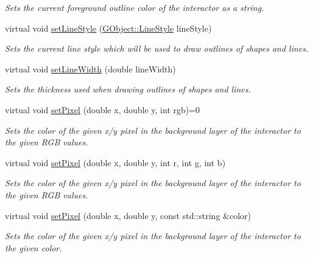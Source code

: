 \begin{DoxyCompactItemize}
\begin{DoxyCompactList}\small\item\em Sets the current foreground outline color of the interactor as a string. \end{DoxyCompactList}\item 
virtual void \mbox{\hyperlink{classsgl_1_1GDrawingSurface_a6bfe14a77101db0fb97b5a7e07a5526b}{set\+Line\+Style}} (\mbox{\hyperlink{classsgl_1_1GObject_a86e0f5648542856159bb40775c854aa7}{G\+Object\+::\+Line\+Style}} line\+Style)
\begin{DoxyCompactList}\small\item\em Sets the current line style which will be used to draw outlines of shapes and lines. \end{DoxyCompactList}\item 
virtual void \mbox{\hyperlink{classsgl_1_1GDrawingSurface_afd6a47c6ea6a1f85ca05a65ba3ff3477}{set\+Line\+Width}} (double line\+Width)
\begin{DoxyCompactList}\small\item\em Sets the thickness used when drawing outlines of shapes and lines. \end{DoxyCompactList}\item 
virtual void \mbox{\hyperlink{classsgl_1_1GDrawingSurface_ac9f0a75ccb0abe1123046bab56479b84}{set\+Pixel}} (double x, double y, int rgb)=0
\begin{DoxyCompactList}\small\item\em Sets the color of the given x/y pixel in the background layer of the interactor to the given R\+GB values. \end{DoxyCompactList}\item 
virtual void \mbox{\hyperlink{classsgl_1_1GDrawingSurface_aec90e927c9da286214908d3f9da685d7}{set\+Pixel}} (double x, double y, int r, int g, int b)
\begin{DoxyCompactList}\small\item\em Sets the color of the given x/y pixel in the background layer of the interactor to the given R\+GB values. \end{DoxyCompactList}\item 
virtual void \mbox{\hyperlink{classsgl_1_1GDrawingSurface_a09f9640e4ff7388dcfc391efd88d2415}{set\+Pixel}} (double x, double y, const std\+::string \&color)
\begin{DoxyCompactList}\small\item\em Sets the color of the given x/y pixel in the background layer of the interactor to the given color. \end{DoxyCompactList}\item 

\end{DoxyCompactItemize}
